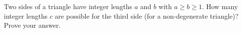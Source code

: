 Two sides of a triangle have integer lengths $a$ and $b$ with $a\ge b\ge1$. How many integer lengths $c$ are possible for the third side (for a non-degenerate triangle)? Prove your answer.

